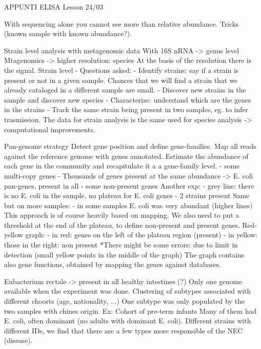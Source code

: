 APPUNTI ELISA
Lesson 24/03

With sequencing alone you cannot see more than relative abundance. Tricks (known sample with known abundance?).

Strain level analysis with metagenomic data
With 16S nRNA -> genus level
Mtagenomics -> higher resolution: species
At the basis of the resolution there is the signal. 
Strain level - Questions asked:
- Identify strains: say if a strain is present or not in a given sample. Chances that we will find a strain that we already cataloged in a different sample are small.
- Discover new strains in the sample and discover new species 
- Characterize: understand which are the genes in the strains
- Track the same strain being present in two samples, eg. to infer trasmission.
The data for strain analysis is the same used for species analysis -> computational improvements. 

Pan-genome strategy
Detect gene position and define gene-families.
Map all reads against the reference genome with genes annotated. Estimate the abundance of each gene in the community and recapitulate it a a gene-family level. 
- some multi-copy genes
- Thousands of genes present at the same abundance -> E. coli pan-genes, present in all 
- some non-present genes
Another exp: 
- grey line: there is no E. coli in the sample, no plateau for E. coli genes
- 2 strains present 
Same but on more samples:
- in some samples E. coli was very abundant (higher lines)
This approach is of course heavily based on mapping. We also need to put a threshold at the end of the plateau, to define non-present and present genes. 
Red-yellow graph:
- in red: genes on the left of the plateau region (present)
- in yellow: those in the right: non present
*There might be some errors: due to limit in detection (small yellow points in the middle of the graph)
The graph contains also gene functions, obtained by mapping the genes against databases. 

Eubacterium rectale -> present in all healthy intestines (?)
Only one genome available when the experiment was done. Clustering of subtypes associated with different choorts (age, nationality, ...)
One subtype was only populated by the two samples with chines origin.
Ex: Cohort of pre-term infants
Many of them had E. coli, often dominant (no adults with dominant E. coli).
Different strains with different IDs, we find that there are a few types more responsible of the NEC (disease). 

